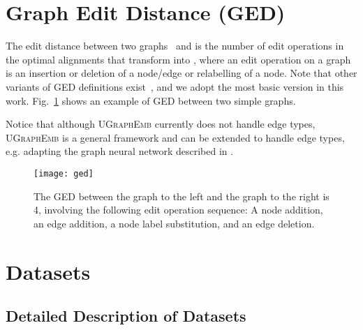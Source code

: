 \documentclass{article}
\newcommand{\model}{\textsc{UGraphEmb}\xspace}
\begin{document}
\label{sec-related}


 \section{Graph Edit Distance (GED)}
\label{sec-func}



The edit distance between two graphs~\cite{bunke1983distance}  and 
is the number of edit operations in the optimal alignments that transform  into , where an edit operation on a graph  is an insertion or deletion of a node/edge or relabelling of a node. Note that other variants of GED definitions exist~\cite{riesen2013novel}, and we adopt the most basic version in this work.
Fig.~\ref{fig:ged} shows an example of GED between two simple graphs.

Notice that although \model currently does not handle edge types, \model is a general framework and can be extended to handle edge types, e.g. adapting the graph neural network described in \cite{kipf2018neural}.


\begin{figure}[h]
\centering
\texttt{[image: ged]}
\caption{The GED between the graph to the left and the graph to the right is 4, involving the following edit operation sequence: A node addition, an edge addition, a node label substitution, and an edge deletion.}
\label{fig:ged}
\vspace*{-2mm}
\end{figure}









%
 \section{Datasets}
\label{sec-data}

\subsection{Detailed Description of Datasets}
\end{document}
